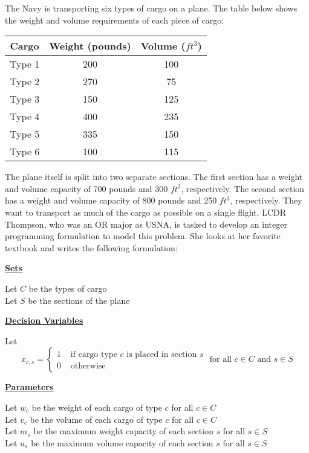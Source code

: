 \documentclass[12pt]{exam}
\begin{document}
\begin{questions}
\begin{parts}
\end{parts}


\question The Navy is transporting six types of cargo on a plane. The table below shows the weight and volume requirements of each piece of cargo:

\begin{center}
\begin{tabular}{c|cc} 
\hline 
Cargo   &  Weight (pounds) & Volume ($ft^3$) \\ \hline 
 Type 1 &  200             & 100             \\ 
 Type 2 &  270             & 75              \\ 
 Type 3 &  150             & 125              \\ 
 Type 4 &  400             & 235              \\ 
 Type 5 &  335             & 150              \\
 Type 6 &  100             & 115              \\  \hline
\end{tabular}
\end{center}

The plane itself is split into two separate sections. The first section has a weight and volume capacity of 700 pounds and 300 $ft^3$, respectively. The second section has a weight and volume capacity of 800 pounds and 250 $ft^3$, respectively. They want to transport as much of the cargo as possible on a single flight. LCDR Thompson, who was an OR major as USNA, is tasked to develop an integer programming formulation to model this problem. She looks at her favorite textbook and writes the following formulation:

\textbf{\underline{Sets}}

Let $C$ be the types of cargo \\ 
Let $S$ be the sections of the plane

\textbf{\underline{Decision Variables}}

Let 
\[
x_{c,s} = 
\begin{cases}
1 & \text{ if cargo type $c$ is placed in section $s$} \\
0 & \text{ otherwise}
\end{cases} \text{ for all $c \in C$ and $s \in S$}
\] 

\textbf{\underline{Parameters}}

Let $w_c$ be the weight of each cargo of type $c$ for all $c \in C$ \\
Let $v_c$ be the volume of each cargo of type $c$ for all $c \in C$ \\
Let $m_s$ be the maximum weight capacity of each section $s$ for all $s \in S$ \\
Let $u_s$ be the maximum volume capacity of each section $s$ for all $s \in S$


\end{questions}
\end{document}
